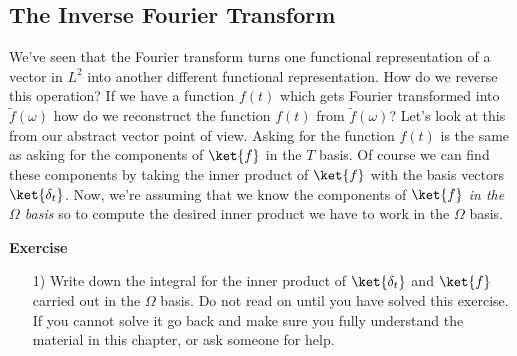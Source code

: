 \subsection{The Inverse Fourier Transform}
We've seen that the Fourier transform turns one functional representation of a vector in $L^2$ into another different functional representation.  How do we reverse this operation?  If we have a function $f(t)$ which gets Fourier transformed into $\tilde{f}(\omega)$ how do we reconstruct the function $f(t)$ from $\tilde{f}(\omega)$?  Let's look at this from our abstract vector point of view.  Asking for the function $f(t)$ is the same as asking for the components of $\ket{f}$ in the $T$ basis.  Of course we can find these components by taking the inner product of $\ket{f}$ with the basis vectors $\ket{\delta_t}$.  Now, we're assuming that we know the components of $\ket{f}$ \emph{in the $\Omega$ basis} so to compute the desired inner product we have to work in the $\Omega$ basis.

\begin{flushleft} \textbf{Exercise} \end{flushleft}
\begin{itemize}\item[1)] Write down the integral for the inner product of $\ket{\delta_t}$ and $\ket{f}$ carried out in the $\Omega$ basis.  Do not read on until you have solved this exercise.  If you cannot solve it go back and make sure you fully understand the material in this chapter, or ask someone for help.
\end{itemize}

